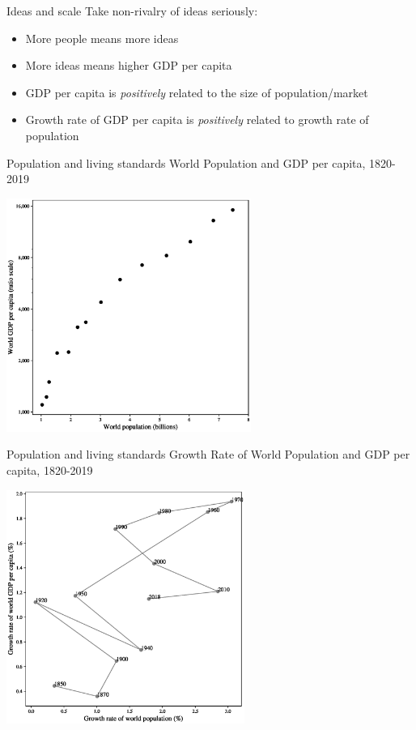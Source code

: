 \begin{frame}{Ideas and scale}
Take non-rivalry of ideas seriously:
\begin{itemize}
	\item More people means more ideas
	\item More ideas means higher GDP per capita
	\item GDP per capita is \textit{positively} related to the size of population/market
	\item Growth rate of GDP per capita is \textit{positively} related to growth rate of population
\end{itemize}
\end{frame}

\begin{frame}{Population and living standards}
World Population and GDP per capita, 1820-2019
\begin{center}
\includegraphics[height = 3in]{../Figures/fig-ch4-fig6.eps}
\end{center}
\end{frame}

\begin{frame}{Population and living standards}
Growth Rate of World Population and GDP per capita, 1820-2019
\begin{center}
\includegraphics[height = 3in]{../Figures/fig-ch4-fig7.eps}
\end{center}
\end{frame}

